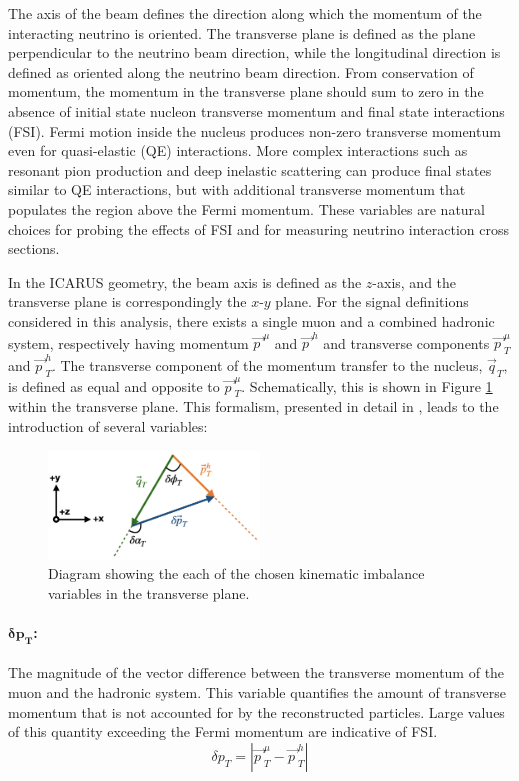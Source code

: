 The axis of the beam defines the direction along which the momentum of the interacting neutrino is oriented. The transverse plane is defined as the plane perpendicular to the neutrino beam direction, while the longitudinal direction is defined as oriented along the neutrino beam direction. From conservation of momentum, the momentum in the transverse plane should sum to zero in the absence of initial state nucleon transverse momentum and final state interactions (FSI). Fermi motion inside the nucleus produces non-zero transverse momentum even for quasi-elastic (QE) interactions. More complex interactions such as resonant pion production and deep inelastic scattering can produce final states similar to QE interactions, but with additional transverse momentum that populates the region above the Fermi momentum. These variables are natural choices for probing the effects of FSI and for measuring neutrino interaction cross sections.

In the ICARUS geometry, the beam axis is defined as the $z$-axis, and the transverse plane is correspondingly the $x$-$y$ plane. For the signal definitions considered in this analysis, there exists a single muon and a combined hadronic system, respectively having momentum $\vec{p\ }^\mu$ and $\vec{p\ }^h$ and transverse components $\vec{p\ }^\mu_T$ and $\vec{p\ }^h_T$. The transverse component of the momentum transfer to the nucleus, $\vec{q}_T$, is defined as equal and opposite to $\vec{p\ }^\mu_T$. Schematically, this is shown in Figure \ref{fig:kinematic_imbalance} within the transverse plane. This formalism, presented in detail in \cite{MicroBooNE2024}, leads to the introduction of several variables:

\begin{figure}
    \centering
    \includegraphics[width=0.5\textwidth]{figures/neutrino_selection/kinematic_imbalance_diagram.png}
    \caption{Diagram showing the each of the chosen kinematic imbalance variables in the transverse plane.}
    \label{fig:kinematic_imbalance}
\end{figure}

\paragraph{$\mathbf{\delta p_T}$:}
The magnitude of the vector difference between the transverse momentum of the muon and the hadronic system. This variable quantifies the amount of transverse momentum that is not accounted for by the reconstructed particles. Large values of this quantity exceeding the Fermi momentum are indicative of FSI.
\begin{equation}
    \delta p_T = \left|\vec{p\ }^\mu_T - \vec{p\ }^h_T\right|
\end{equation}


